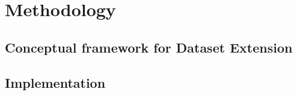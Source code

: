 
\chapter{Methodology}  \label{sec:method}

\section{Conceptual framework for Dataset Extension}


\section{Implementation}
